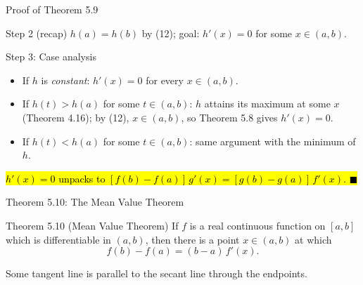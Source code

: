 \documentclass[aspectratio=169,12pt,t]{beamer}
\begin{document}
{%
\begin{frame}{Proof of Theorem 5.9}
  \begin{proofblock}{Step 2 (recap)}
    $h(a) = h(b)$ by (12); \quad goal: $h'(x) = 0$ for some $x \in (a, b)$.
  \end{proofblock}

  \begin{proofblock}{Step 3: Case analysis}
    \begin{itemize}
      \item If $h$ is \emph{constant}: $h'(x) = 0$ for every $x \in (a,b)$. \checkmark
      \item If $h(t) > h(a)$ for some $t \in (a, b)$: $h$ attains its
        \alert{maximum} at some $x$ (Theorem 4.16); by (12), $x \in (a, b)$,
        so Theorem 5.8 gives $h'(x) = 0$. \checkmark
      \item If $h(t) < h(a)$ for some $t \in (a, b)$: same argument with the
        \alert{minimum} of $h$. \checkmark
    \end{itemize}
  \end{proofblock}

  \vspace{-0.7em}
  \hl{$h'(x) = 0$ unpacks to $\boxed{[f(b)-f(a)]\,g'(x) = [g(b)-g(a)]\,f'(x).}$ \quad $\blacksquare$}

\end{frame}

\begin{frame}{Theorem 5.10: The Mean Value Theorem}
  \begin{thmblock}{Theorem 5.10 (Mean Value Theorem)}
    If $f$ is a real continuous function on $[a, b]$ which is differentiable
    in $(a, b)$, then there is a point $x \in (a, b)$ at which
    \[
      f(b) - f(a) = (b - a)\, f'(x).
    \]
  \end{thmblock}

  \vspace{0.3em}
  \begin{hlbox}
  Some tangent line is \alert{parallel to the secant line} through the endpoints.
  \end{hlbox}
  

\end{frame}}
\end{document}
